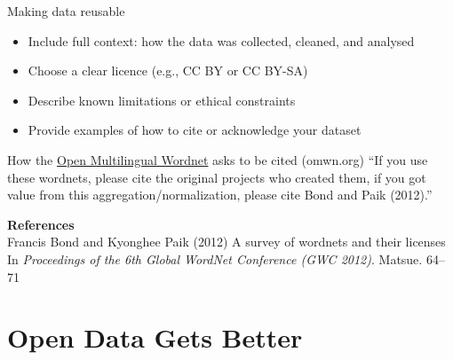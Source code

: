 \documentclass[aspectratio=169]{beamer}
\begin{document}
\begin{frame}{Making data reusable}
\begin{itemize}
  \item Include full context: how the data was collected, cleaned, and analysed
  \item Choose a clear licence (e.g., CC BY or CC BY-SA)
  \item Describe known limitations or ethical constraints
  \item Provide examples of how to cite or acknowledge your dataset
  \end{itemize}
  \begin{exampleblock}{How the \href{https://omwn.org/}{Open Multilingual Wordnet} asks to be cited (omwn.org)}
  ``If you use these wordnets, please cite the original projects who created them, if you got value from this aggregation/normalization, please cite Bond and Paik (2012).''
  \medskip

    \textbf{References} \\
Francis Bond and Kyonghee Paik (2012)
A survey of wordnets and their licenses In \textit{Proceedings of the 6th Global WordNet Conference (GWC 2012)}. Matsue. 64–71
\end{exampleblock}

\end{frame}
\section{Open Data Gets Better}
\end{document}
